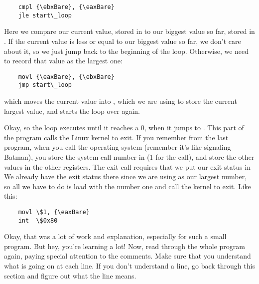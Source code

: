 \begin{simpletyping}
\begin{lstlisting}
	cmpl {\ebxBare}, {\eaxBare}
	jle start\_loop
\end{lstlisting}
\end{simpletyping}

Here we compare our current value, stored in {\eaxReg}
to our biggest value so far, stored in {\ebxReg}.  If
the current value is less or equal to our biggest value so far, we don't 
care about it, so we just jump back to the beginning of the loop.  
Otherwise, we need to record that value as the largest one:

\begin{simpletyping}
\begin{lstlisting}
	movl {\eaxBare}, {\ebxBare}
	jmp start\_loop
\end{lstlisting}
\end{simpletyping}

which moves the current value into {\ebxReg}, which we are
using to store the current largest value,  and starts
the loop over again.  

Okay, so the loop executes until it reaches a 0, when it jumps
to .  This part of the program calls
the Linux kernel to exit.  If you remember from the last program,
when you call the operating system (remember it's like signaling Batman), 
you store the 
system call 
number in {\eaxRegIdx} 
(1 for the  call),
and store the other values in the other registers.  The exit call
requires that we put our exit status in {\ebxRegIdx}
We already have the exit status there since we are using {\ebxReg}
as our largest number, so all we have to do is load {\eaxReg} with the number one
and call the kernel to exit. Like this:

\begin{simpletyping}
\begin{lstlisting}
	movl \$1, {\eaxBare}
	int  \$0x80
\end{lstlisting}
\end{simpletyping}

Okay, that was a lot of work and explanation, especially for such a
small program.  But hey, you're learning a lot!  Now,
read through the whole program again, paying special
attention to the comments.  Make sure that you understand what is going
on at each line.  If you don't understand a line, go back through this
section and figure out what the line means.

